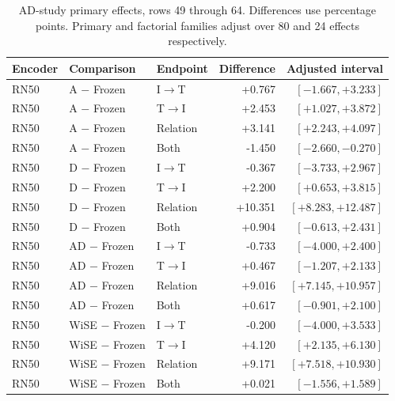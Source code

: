 \begin{table}[t]
\centering
\small
\setlength{\tabcolsep}{3pt}
\begin{tabular}{lllrr}
\toprule
Encoder & Comparison & Endpoint & Difference & Adjusted interval\\
\midrule
RN50 & A $-$ Frozen & I$\to$T & +0.767 & $[-1.667,+3.233]$ \\
RN50 & A $-$ Frozen & T$\to$I & +2.453 & $[+1.027,+3.872]$ \\
RN50 & A $-$ Frozen & Relation & +3.141 & $[+2.243,+4.097]$ \\
RN50 & A $-$ Frozen & Both & -1.450 & $[-2.660,-0.270]$ \\
RN50 & D $-$ Frozen & I$\to$T & -0.367 & $[-3.733,+2.967]$ \\
RN50 & D $-$ Frozen & T$\to$I & +2.200 & $[+0.653,+3.815]$ \\
RN50 & D $-$ Frozen & Relation & +10.351 & $[+8.283,+12.487]$ \\
RN50 & D $-$ Frozen & Both & +0.904 & $[-0.613,+2.431]$ \\
RN50 & AD $-$ Frozen & I$\to$T & -0.733 & $[-4.000,+2.400]$ \\
RN50 & AD $-$ Frozen & T$\to$I & +0.467 & $[-1.207,+2.133]$ \\
RN50 & AD $-$ Frozen & Relation & +9.016 & $[+7.145,+10.957]$ \\
RN50 & AD $-$ Frozen & Both & +0.617 & $[-0.901,+2.100]$ \\
RN50 & WiSE $-$ Frozen & I$\to$T & -0.200 & $[-4.000,+3.533]$ \\
RN50 & WiSE $-$ Frozen & T$\to$I & +4.120 & $[+2.135,+6.130]$ \\
RN50 & WiSE $-$ Frozen & Relation & +9.171 & $[+7.518,+10.930]$ \\
RN50 & WiSE $-$ Frozen & Both & +0.021 & $[-1.556,+1.589]$ \\
\bottomrule
\end{tabular}
\caption{AD-study primary effects, rows 49 through 64. Differences use percentage points. Primary and factorial families adjust over 80 and 24 effects respectively.}\label{tab:adprimary48}
\end{table}


